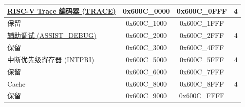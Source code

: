 \begin{ThreePartTable}
\begin{longtable}[c]{ |p{7cm}|c|c|r| }
\hyperref[mod:riscvtracenc]{RISC-V Trace 编码器 (TRACE)}                       & 0x600C\_0000 & 0x600C\_0FFF &   4     \\\hline
    \rowcolor{gray!25}  保留                    & 0x600C\_1000 & 0x600C\_1FFF &         \\\hline
\hyperref[mod:dbgassist]{辅助调试 (ASSIST\_DEBUG)\tnote{\textcolor{red}{*}}}               & 0x600C\_2000 & 0x600C\_2FFF &   4     \\\hline
    \rowcolor{gray!25}  保留                    & 0x600C\_3000 & 0x600C\_4FFF &         \\\hline
\hyperref[mod:riscvcpu]{中断优先级寄存器 (INTPRI)}                & 0x600C\_5000 & 0x600C\_5FFF &   4     \\\hline
    \rowcolor{gray!25}  保留                    & 0x600C\_6000 & 0x600C\_7FFF &         \\\hline
Cache                & 0x600C\_8000 & 0x600C\_8FFF &   4     \\\hline
    \rowcolor{gray!25}  保留                    & 0x600C\_9000 & 0x600C\_FFFF &         \\\hline

\end{longtable}
\end{ThreePartTable}

